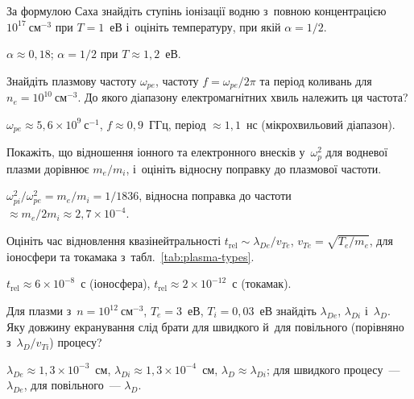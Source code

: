 \begin{problem}\label{prb:PlasmaSaha}
	За формулою Саха знайдіть ступінь іонізації водню з~повною концентрацією
	$10^{17}~\mathrm{см}^{-3}$ при $T=1$~еВ і~оцініть температуру, при якій
	$\alpha=1/2$.
	\begin{solution}
		$\alpha\approx0{,}18$; $\alpha=1/2$ при $T\approx1{,}2$~еВ.
	\end{solution}
\end{problem}

\begin{problem}\label{prb:PlasmaFrequency}
Знайдіть плазмову частоту $\omega_{pe}$, частоту $f=\omega_{pe}/2\pi$ та період коливань
для $n_e=10^{10}~\mathrm{см}^{-3}$. До якого діапазону електромагнітних хвиль належить ця
частота?
	\begin{solution}
		$\omega_{pe}\approx5{,}6\times10^{9}~\mathrm{с}^{-1}$, $f\approx0{,}9$~ГГц, період $\approx1{,}1$~нс (мікрохвильовий діапазон).
	\end{solution}
\end{problem}

\begin{problem}\label{prb:PlasmaIons}
Покажіть, що відношення іонного та електронного внесків у~$\omega_p^2$ для водневої плазми
дорівнює $m_e/m_i$, і~оцініть відносну поправку до плазмової частоти.
	\begin{solution}
		$\omega_{pi}^2/\omega_{pe}^2=m_e/m_i=1/1836$, відносна поправка до частоти $\approx m_e/2m_i\approx2{,}7\times10^{-4}$.
	\end{solution}
\end{problem}

\begin{problem}\label{prb:PlasmaRelax}
	Оцініть час відновлення квазінейтральності $t_\mathrm{rel}\sim\lambda_{De}/v_{Te}$, $v_{Te}=\sqrt{T_e/m_e}$, для іоносфери
	та токамака з~табл.~\ref{tab:plasma-types}.
	\begin{solution}
		$t_\mathrm{rel}\approx6\times10^{-8}$~с (іоносфера), $t_\mathrm{rel}\approx2\times10^{-12}$~с (токамак).
	\end{solution}
\end{problem}

\begin{problem}\label{prb:PlasmaTwoTemp}
	Для плазми з~$n=10^{12}~\mathrm{см}^{-3}$, $T_e=3$~еВ, $T_i=0{,}03$~еВ знайдіть $\lambda_{De}$, $\lambda_{Di}$ і~$\lambda_D$.
	Яку довжину екранування слід брати для швидкого й~для повільного (порівняно з~$\lambda_D/v_{Ti}$) процесу?
	\begin{solution}
		$\lambda_{De}\approx1{,}3\times10^{-3}$~см, $\lambda_{Di}\approx1{,}3\times10^{-4}$~см, $\lambda_D\approx\lambda_{Di}$;
	для швидкого процесу~--- $\lambda_{De}$, для повільного~--- $\lambda_D$.
	\end{solution}
\end{problem}


